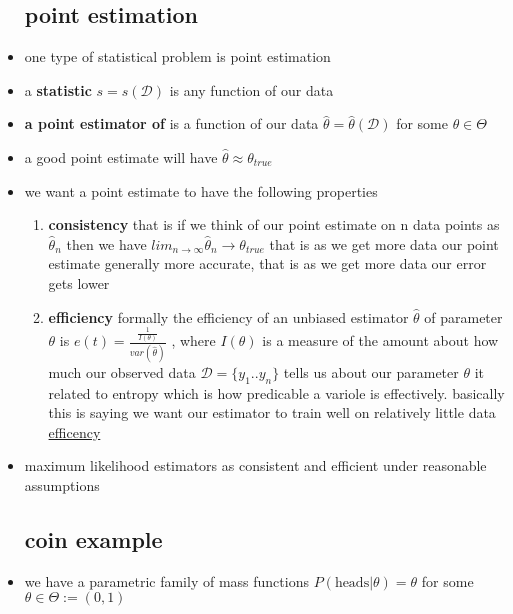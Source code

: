 \documentclass{article}
\begin{document}
\begin{itemize}
\subsection*{point estimation}
\item one type of statistical problem is point estimation
\item a \textbf{statistic} $s=s(\mathcal{D})$ is any function of our data 
\item \textbf{a point estimator of } \boldmath{$\theta$} is a function of our data $\hat{\theta}=\hat{\theta}
(\mathcal
D)$ for some $\theta\in \Theta$
\item a good point estimate will have $\hat{\theta}\approx \theta_{true}$
\item we want a point estimate to have the following properties
\begin{enumerate}
    \item \textbf{consistency} that is if we think of our point estimate on n data points as $\hat{\theta}_{n}$ then we have $lim_{n\rightarrow\infty}\hat{\theta}_n\rightarrow \theta_{true}$ that is as we get more data our point estimate generally more accurate, that is as we get more data our error gets lower
    \item \textbf{efficiency} formally the efficiency of an unbiased estimator $\hat{\theta}$ of parameter $\theta$ is $e(t)=\frac{\frac{1}{I(\theta)}}{var(\hat{\theta})}$ , where $I(\theta)$ is a measure of the amount about how much our observed data $\mathcal{D}=\{y_1..y_n\}$ tells us about our parameter $\theta$ it related to entropy which is how predicable a variole is effectively. basically this is saying we want our estimator to train well on relatively little data  \href{https://en.wikipedia.org/wiki/Efficiency_(statistics)}{efficency}
\end{enumerate}  
\item maximum likelihood estimators as consistent and efficient under reasonable assumptions
\subsection{coin example}
\item we have a parametric family of mass functions $P(\text{heads}|\theta)=\theta$ for some $\theta\in\Theta:=(0,1)$

\end{itemize}
\end{document}
